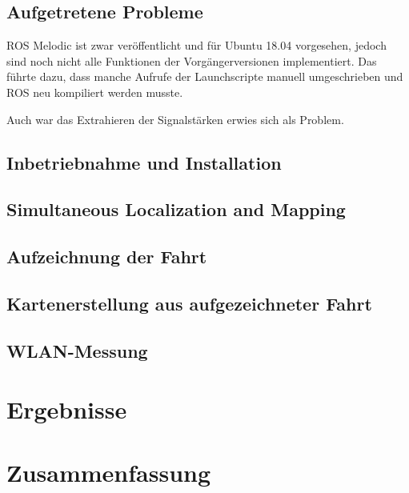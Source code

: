 \documentclass{scrartcl}%
\begin{document}
\subsection{Aufgetretene Probleme}
ROS Melodic ist zwar veröffentlicht und für Ubuntu 18.04 vorgesehen, jedoch sind noch nicht alle Funktionen der Vorgängerversionen implementiert. Das führte dazu, dass manche Aufrufe der Launchscripte manuell umgeschrieben und ROS neu kompiliert werden musste.

Auch war das Extrahieren der Signalstärken erwies sich als Problem.

\subsection{Inbetriebnahme und Installation}

\subsection{Simultaneous Localization and Mapping}

\subsection{Aufzeichnung der Fahrt}

\subsection{Kartenerstellung aus aufgezeichneter Fahrt}

\subsection{WLAN-Messung}

\section{Ergebnisse}

\section{Zusammenfassung}
\end{document}
